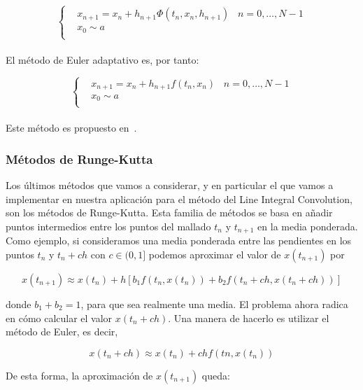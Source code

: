 \begin{equation}
		\left\{
		\begin{aligned}
			& x_{n+1} = x_n + h_{n+1}\Phi(t_n,x_n,h_{n+1}) \;\;\; n= 0,\ldots,N-1 \\
			& x_0 \sim a \\
		\end{aligned}
		\right.
\end{equation}\\

El método de Euler adaptativo es, por tanto:

\begin{equation}
		\left\{
		\begin{aligned}
			& x_{n+1} = x_n + h_{n+1}f(t_n,x_n) \;\;\; n= 0,\ldots,N-1 \\
			& x_0 \sim a \\
		\end{aligned}
		\right.
\end{equation}\\

Este método es propuesto en~\citet{osti_10185520}.

\subsubsection{Métodos de Runge-Kutta}
\label{makereference5.4.3.3}

Los últimos métodos que vamos a considerar, y en particular el que vamos a
implementar en nuestra aplicación para el método del Line Integral Convolution,
son los métodos de Runge-Kutta. Esta familia de métodos se basa en añadir puntos
intermedios entre los puntos del mallado $t_n$ y $t_{n+1}$ en la media
ponderada. \\

Como ejemplo, si consideramos una media ponderada entre las pendientes en los
puntos $t_n$ y $t_n + ch$ con $c \in (0,1]$ podemos aproximar el valor de
$x(t_{n+1})$ por 

\[x(t_{n+1}) \approx x(t_n) + h\left[ b_1f(t_n,x(t_n)) + b_2f(t_n + ch,
x(t_n+ch))\right]\]

donde $b_1 + b_2 = 1$, para que sea realmente una media. El problema ahora
radica en cómo calcular el valor $x(t_n +ch)$. Una manera de hacerlo es utilizar
el método de Euler, es decir,

\[x(t_n + ch) \approx x(t_n) + chf(tn,x(t_n))\]

De esta forma, la aproximación de $x(t_{n+1})$ queda:

